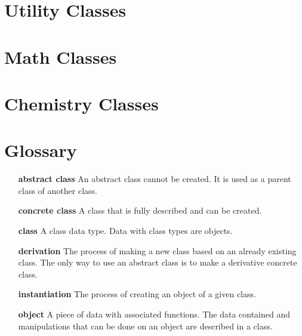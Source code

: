 \documentclass[notitlepage,letterpaper%
              ]{report}
\begin{document}






\chapter{Utility Classes}
\label{firstclasschapt}




\chapter{Math Classes}





\chapter{Chemistry Classes}
\label{lastclasschapt}








\begin{htmlonly}

\end{htmlonly}

\chapter*{Glossary}
\label{glossary}

\begin{itemize}
\item[{\bfseries abstract class}]
          An abstract class cannot be created.  It is used
          as a parent class of another class.
\item[{\bfseries concrete class}]
          A class that is fully described and can be created.
\item[{\bfseries class}]
          A class data type.  Data with class types are objects.
\item[{\bfseries derivation}]
          The process of making a new class based on an already
          existing class.  The only way to use an abstract class
          is to make a derivative concrete class.
\item[{\bfseries instantiation}]
          The process of creating an object of a given class.
\item[{\bfseries object}]
          A piece of data with associated functions.  The data
          contained and manipulations that can be done on an object
          are described in a class.
\end{itemize}

\printindex
\end{document}
